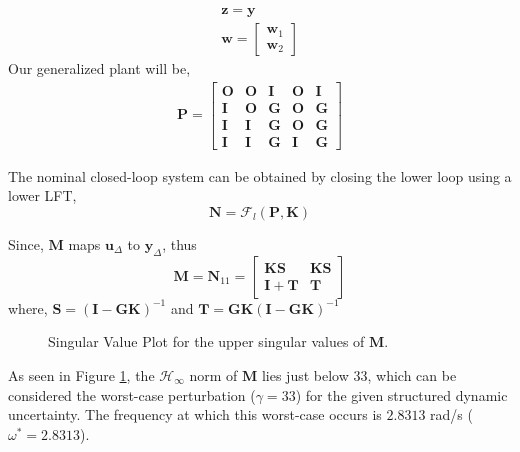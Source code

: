 \begin{align*}
    \bm{z} = \bm{y}\\
    \bm{w} = 
    \begin{bmatrix}
        \bm{w}_1\\
        \bm{w}_2
    \end{bmatrix}
\end{align*}
Our generalized plant will be,
\begin{align*}
    \bm{P} = 
    \begin{bmatrix}
        \bm{O} & \bm{O} & \bm{I} & \bm{O} &\bm{I}\\
        \bm{I} & \bm{O} & \bm{G} & \bm{O} & \bm{G}\\
        \bm{I} & \bm{I} & \bm{G} & \bm{O} & \bm{G}\\
        \bm{I} & \bm{I} & \bm{G} & \bm{I} & \bm{G}
    \end{bmatrix}
\end{align*}

The nominal closed-loop system can be obtained by closing the lower loop using a lower LFT, $$\bm{N} = \mathcal{F}_l(\bm{P},\bm{K})$$

Since, $\bm{M}$ maps $\bm{u}_\Delta$ to $\bm{y}_\Delta$, thus $$\bm{M} = \bm{N}_{11} =
\begin{bmatrix}
    \bm{K}\bm{S} & \bm{K}\bm{S}\\
    \bm{I} + \bm{T} & \bm{T}
\end{bmatrix}$$
where, $\bm{S} = \left(\bm{I} - \bm{GK}\right)^{-1}$ and $\bm{T} = \bm{GK}\left(\bm{I} - \bm{GK}\right)^{-1}$

\begin{figure}[h!]
    \centering
    \scalebox{0.7}{
    \begin{tikzpicture}
        
    \end{tikzpicture}
    }
    \caption{Singular Value Plot for the upper singular values of $\mathbf{M}$.}
    \label{Msing}
\end{figure}

As seen in Figure \ref{Msing}, the $\mathcal{H}_\infty$ norm of $\mathbf{M}$ lies just below $33$, which can be considered the worst-case perturbation ($\gamma = 33$) for the given structured dynamic uncertainty. The frequency at which this worst-case occurs is $2.8313$ rad/s ($\omega^* = 2.8313$).

